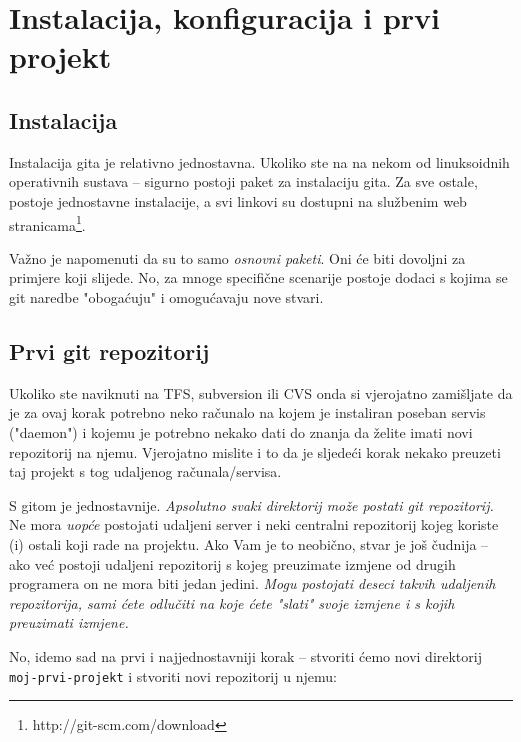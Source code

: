 \chapter*{Instalacija, konfiguracija i prvi projekt}

\section*{Instalacija}

Instalacija gita je relativno jednostavna. Ukoliko ste na na nekom od linuksoidnih operativnih sustava -- sigurno postoji paket za instalaciju gita. 
Za sve ostale, postoje jednostavne instalacije, a svi linkovi su dostupni na službenim web stranicama\footnote{http://git-scm.com/download}.

Važno je napomenuti da su to samo \emph{osnovni paketi}. 
Oni će biti dovoljni za primjere koji slijede. 
No, za mnoge specifične scenarije postoje dodaci s kojima se git naredbe "obogaćuju" i omogućavaju nove stvari.

\section*{Prvi git repozitorij}

Ukoliko ste naviknuti na TFS, subversion ili CVS onda si vjerojatno zamišljate da je za ovaj korak potrebno neko računalo na kojem je instaliran poseban servis ("daemon") i kojemu je potrebno nekako dati do znanja da želite imati novi repozitorij na njemu.
Vjerojatno mislite i to da je sljedeći korak nekako preuzeti taj projekt s tog udaljenog računala/servisa.

S gitom je jednostavnije. 
\emph{Apsolutno svaki direktorij može postati git repozitorij.}
Ne mora \emph{uopće} postojati udaljeni server i neki centralni repozitorij kojeg koriste (i) ostali koji rade na projektu.
Ako Vam je to neobično, stvar je još čudnija -- ako već postoji udaljeni repozitorij s kojeg preuzimate izmjene od drugih programera on ne mora biti jedan jedini.
\emph{Mogu postojati deseci takvih udaljenih repozitorija, sami ćete odlučiti na koje ćete "slati" svoje izmjene i s kojih preuzimati izmjene.}

No, idemo sad na prvi i najjednostavniji korak -- stvoriti ćemo novi direktorij \verb+moj-prvi-projekt+ i stvoriti novi repozitorij u njemu:

